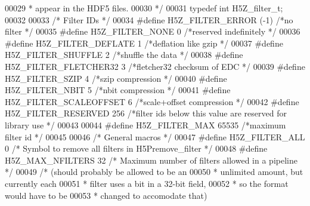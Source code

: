 \begin{DoxyCode}
00029 \textcolor{comment}{ * appear in the HDF5 files.}
00030 \textcolor{comment}{ */}
00031 \textcolor{keyword}{typedef} \textcolor{keywordtype}{int} H5Z\_filter\_t;
00032 
00033 \textcolor{comment}{/* Filter IDs */}
00034 \textcolor{preprocessor}{#define H5Z\_FILTER\_ERROR    (-1)    }\textcolor{comment}{/*no filter         */}\textcolor{preprocessor}{}
00035 \textcolor{preprocessor}{#define H5Z\_FILTER\_NONE     0   }\textcolor{comment}{/*reserved indefinitely     */}\textcolor{preprocessor}{}
00036 \textcolor{preprocessor}{#define H5Z\_FILTER\_DEFLATE  1   }\textcolor{comment}{/*deflation like gzip           */}\textcolor{preprocessor}{}
00037 \textcolor{preprocessor}{#define H5Z\_FILTER\_SHUFFLE      2       }\textcolor{comment}{/*shuffle the data              */}\textcolor{preprocessor}{}
00038 \textcolor{preprocessor}{#define H5Z\_FILTER\_FLETCHER32   3       }\textcolor{comment}{/*fletcher32 checksum of EDC    */}\textcolor{preprocessor}{}
00039 \textcolor{preprocessor}{#define H5Z\_FILTER\_SZIP         4       }\textcolor{comment}{/*szip compression              */}\textcolor{preprocessor}{}
00040 \textcolor{preprocessor}{#define H5Z\_FILTER\_NBIT         5       }\textcolor{comment}{/*nbit compression              */}\textcolor{preprocessor}{}
00041 \textcolor{preprocessor}{#define H5Z\_FILTER\_SCALEOFFSET  6       }\textcolor{comment}{/*scale+offset compression      */}\textcolor{preprocessor}{}
00042 \textcolor{preprocessor}{#define H5Z\_FILTER\_RESERVED     256 }\textcolor{comment}{/*filter ids below this value are reserved for library use */}\textcolor{preprocessor}{}
00043 
00044 \textcolor{preprocessor}{#define H5Z\_FILTER\_MAX      65535   }\textcolor{comment}{/*maximum filter id     */}\textcolor{preprocessor}{}
00045 
00046 \textcolor{comment}{/* General macros */}
00047 \textcolor{preprocessor}{#define H5Z\_FILTER\_ALL      0   }\textcolor{comment}{/* Symbol to remove all filters in H5Premove\_filter */}\textcolor{preprocessor}{}
00048 \textcolor{preprocessor}{#define H5Z\_MAX\_NFILTERS        32      }\textcolor{comment}{/* Maximum number of filters allowed in a pipeline */}\textcolor{preprocessor}{}
00049                                         \textcolor{comment}{/* (should probably be allowed to be an}
00050 \textcolor{comment}{                                         * unlimited amount, but currently each}
00051 \textcolor{comment}{                                         * filter uses a bit in a 32-bit field,}
00052 \textcolor{comment}{                                         * so the format would have to be}
00053 \textcolor{comment}{                                         * changed to accomodate that)}

\end{DoxyCode}

